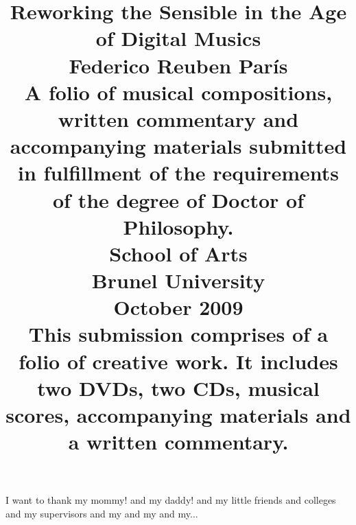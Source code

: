 \documentclass[oneside,11pt]{report}
\title{\huge Reworking the Sensible in the Age of Digital Musics \vspace{70pt} \\ \Large Federico Reuben Par\'{i}s \vspace{20pt} \\ \large A folio of musical compositions, written commentary and accompanying materials submitted \vspace{-5pt} \\ in fulfillment of the requirements of the degree of Doctor of Philosophy. \vspace{30pt} \\ School of Arts \vspace{30pt} \\ Brunel University \vspace{30pt} \\ October 2009 \vspace{90pt} \\ \normalsize This submission comprises of a folio of creative work. It includes two DVDs, two CDs, musical \vspace{-5pt} \\ scores, accompanying materials and a written commentary.}
\date{}
\begin{document}
\maketitle

I want to thank my mommy! and my daddy! and my little friends and colleges and my supervisors and my and my and my...


\tableofcontents
\listoffigures














\end{document}

